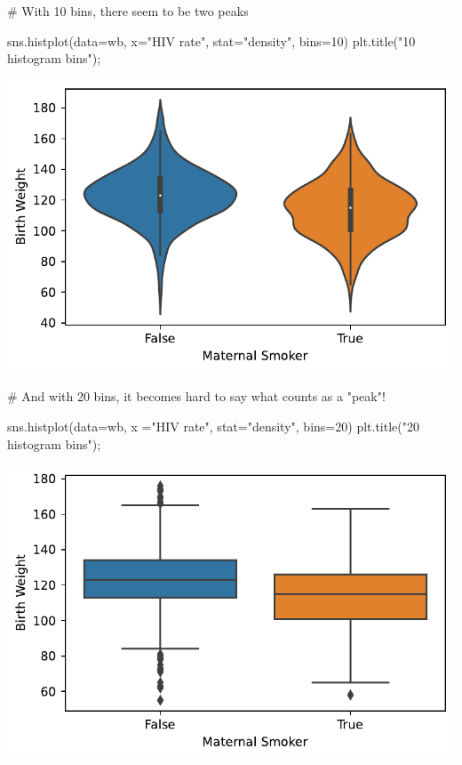 \documentclass[
  letterpaper,
  DIV=11,
  numbers=noendperiod]{scrreprt}
\newenvironment{Shaded}{\begin{snugshade}}{\end{snugshade}}
\newcommand{\CommentTok}[1]{\textcolor[rgb]{0.37,0.37,0.37}{#1}}
\newcommand{\DecValTok}[1]{\textcolor[rgb]{0.68,0.00,0.00}{#1}}
\newcommand{\NormalTok}[1]{\textcolor[rgb]{0.00,0.23,0.31}{#1}}
\newcommand{\OperatorTok}[1]{\textcolor[rgb]{0.37,0.37,0.37}{#1}}
\newcommand{\StringTok}[1]{\textcolor[rgb]{0.13,0.47,0.30}{#1}}
\begin{document}
\begin{Shaded}
\begin{Highlighting}[]
\CommentTok{\# With 10 bins, there seem to be two peaks}

\NormalTok{sns.histplot(data}\OperatorTok{=}\NormalTok{wb, x}\OperatorTok{=}\StringTok{"HIV rate"}\NormalTok{, stat}\OperatorTok{=}\StringTok{"density"}\NormalTok{, bins}\OperatorTok{=}\DecValTok{10}\NormalTok{)}
\NormalTok{plt.title(}\StringTok{"10 histogram bins"}\NormalTok{)}\OperatorTok{;}
\end{Highlighting}
\end{Shaded}

\includegraphics{visualization_1/visualization_1_files/figure-pdf/cell-22-output-1.pdf}

\begin{Shaded}
\begin{Highlighting}[]
\CommentTok{\# And with 20 bins, it becomes hard to say what counts as a "peak"!}

\NormalTok{sns.histplot(data}\OperatorTok{=}\NormalTok{wb, x }\OperatorTok{=}\StringTok{"HIV rate"}\NormalTok{, stat}\OperatorTok{=}\StringTok{"density"}\NormalTok{, bins}\OperatorTok{=}\DecValTok{20}\NormalTok{)}
\NormalTok{plt.title(}\StringTok{"20 histogram bins"}\NormalTok{)}\OperatorTok{;}
\end{Highlighting}
\end{Shaded}

\includegraphics{visualization_1/visualization_1_files/figure-pdf/cell-23-output-1.pdf}
\end{document}
